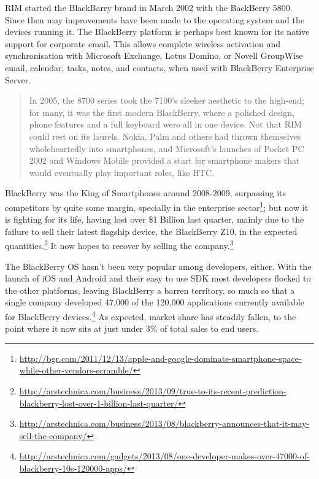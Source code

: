 RIM started the BlackBarry brand in March 2002 with the BackBerry 5800. Since then may improvements have been made to the operating system and the devices running it. The BlackBerry platform is perhaps best known for its native support for corporate email. This allows complete wireless activation and synchronisation with Microsoft Exchange, Lotus Domino, or Novell GroupWise email, calendar, tasks, notes, and contacts, when used with BlackBerry Enterprise Server.
\cite{wikipedia:bb}

\begin{quotation}
In 2005, the 8700 series took the 7100's sleeker aesthetic to the high-end; for many, it was the first modern BlackBerry, where a polished design, phone features and a full keyboard were all in one device. Not that RIM could rest on its laurels. Nokia, Palm and others had thrown themselves wholeheartedly into smartphones, and Microsoft's launches of Pocket PC 2002 and Windows Mobile provided a start for smartphone makers that would eventually play important roles, like HTC.
\cite{fingas:2013}
\end{quotation}


BlackBerry was the King of Smartphones around 2008-2009, surpassing its competitors by quite some margin, specially in the enterprise sector\footnote{\url{http://bgr.com/2011/12/13/apple-and-google-dominate-smartphone-space-while-other-vendors-scramble/}}; but now it is fighting for its life, having lost over \$1 Billion last quarter, mainly due to the failure to sell their latest flagship device, the BlackBerry Z10, in the expected quantities.\footnote{\url{http://arstechnica.com/business/2013/09/true-to-its-recent-prediction-blackberry-lost-over-1-billion-last-quarter/}} It now hopes to recover by selling the company.\footnote{\url{http://arstechnica.com/business/2013/08/blackberry-announces-that-it-may-sell-the-company/}}


The BlackBerry \ac{OS} hasn't been very popular among developers, either. With the launch of iOS and Android and their easy to use \ac{SDK} most developers flocked to the other platforms, leaving BlackBerry a barren territory, so much so that a single company developed 47,000 of the 120,000 applications currently available for BlackBerry devices.\footnote{\url{http://arstechnica.com/gadgets/2013/08/one-developer-makes-over-47000-of-blackberry-10s-120000-apps/}} As expected, market share has steadily fallen, to the point where it now sits at just under 3\% of total sales to end users.
  

